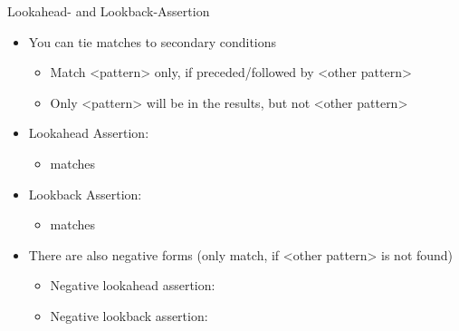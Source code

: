 \begin{frame}{Lookahead- and Lookback-Assertion}
%
\begin{itemize}
\item You can tie matches to secondary conditions
	\begin{itemize}
	\item Match <pattern> only, if preceded/followed by <other pattern>
	\item Only <pattern> will be in the results, but not <other pattern>
	\end{itemize}
\pause
\item Lookahead Assertion: 
	\begin{itemize}
	\item[\Thus]  matches 
	\end{itemize}
\item Lookback Assertion: 
	\begin{itemize}
	\item[\Thus]  matches 
	\end{itemize}
\pause
\item There are also negative forms (only match, if <other pattern> is not found)
	\begin{itemize}
	\item Negative lookahead assertion: 
	\item Negative lookback assertion: 
	\end{itemize}
\end{itemize}
%
\end{frame}


